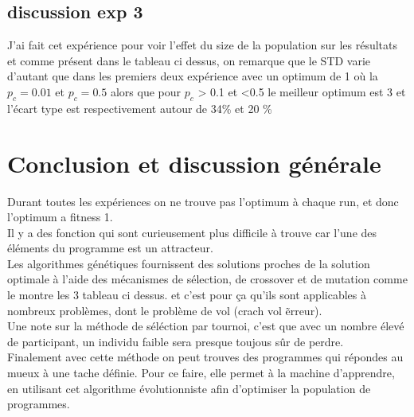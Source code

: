 

\subsection{discussion exp 3}
J'ai fait cet expérience pour voir l'effet du size de la population sur les résultats et comme
présent dans le tableau ci dessus, on remarque que le STD varie d'autant que dans les premiers 
deux expérience avec un optimum de 1 où la $ p_c= 0.01 $ et $ p_c = 0.5 $ alors que 
pour $ p_c$ > 0.1 et <0.5 le meilleur optimum est 3 et l'écart type est respectivement 
autour de 34\% et 20 \%
\section{Conclusion et discussion générale}
Durant toutes les expériences on ne trouve pas l'optimum à chaque run, et donc l'optimum 
a fitness 1.\\
Il y a des fonction qui sont curieusement plus difficile à trouve car l'une des éléments 
du programme est un attracteur.\\

Les algorithmes génétiques fournissent des solutions proches de la solution optimale à 
l'aide des mécanismes de sélection, de crossover et de mutation comme le montre les 3 
tableau ci dessus. et c'est pour ça qu'ils sont applicables à nombreux problèmes, dont 
le problème de vol (crach vol \~ erreur).\\
Une note sur la méthode de séléction par tournoi, c'est que avec un nombre élevé de 
participant, un individu faible sera presque toujous sûr de perdre.\\

Finalement avec cette méthode on peut trouves des programmes qui répondes au mueux 
à une tache définie. Pour ce faire, elle permet à la machine d'apprendre, en utilisant 
cet algorithme évolutionniste afin d'optimiser la population de programmes.


